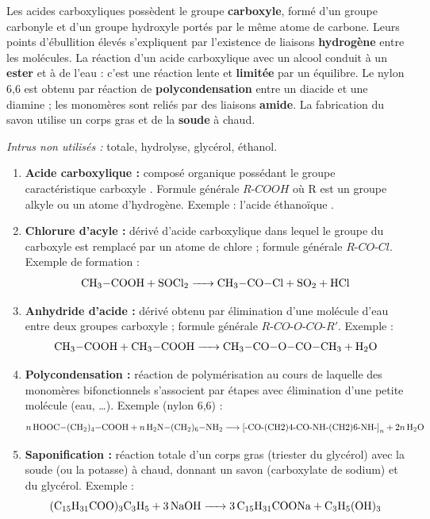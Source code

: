 \documentclass[11pt]{article}
\begin{document}
\begin{corrige}
Les acides carboxyliques possèdent le groupe \textbf{carboxyle}, formé d'un groupe carbonyle et d'un groupe hydroxyle portés par le même atome de carbone. Leurs points d'ébullition élevés s'expliquent par l'existence de liaisons \textbf{hydrogène} entre les molécules. La réaction d'un acide carboxylique avec un alcool conduit à un \textbf{ester} et à de l'eau : c'est une réaction lente et \textbf{limitée} par un équilibre. Le nylon 6,6 est obtenu par réaction de \textbf{polycondensation} entre un diacide et une diamine ; les monomères sont reliés par des liaisons \textbf{amide}. La fabrication du savon utilise un corps gras et de la \textbf{soude} à chaud.

\smallskip
\emph{Intrus non utilisés :} totale, hydrolyse, glycérol, éthanol.
\end{corrige}

\begin{corrige}
\begin{enumerate}
\item \textbf{Acide carboxylique :} composé organique possédant le groupe caractéristique carboxyle . Formule générale $R\text{-}COOH$ où R est un groupe alkyle ou un atome d'hydrogène. Exemple : l'acide éthanoïque .
\item \textbf{Chlorure d'acyle :} dérivé d'acide carboxylique dans lequel le groupe  du carboxyle est remplacé par un atome de chlore ; formule générale $R\text{-}CO\text{-}Cl$. Exemple de formation :
\[ \ce{CH3-COOH + SOCl2 -> CH3-CO-Cl + SO2 + HCl} \]
\item \textbf{Anhydride d'acide :} dérivé obtenu par élimination d'une molécule d'eau entre deux groupes carboxyle ; formule générale $R\text{-}CO\text{-}O\text{-}CO\text{-}R'$. Exemple :
\[ \ce{CH3-COOH + CH3-COOH -> CH3-CO-O-CO-CH3 + H2O} \]
\item \textbf{Polycondensation :} réaction de polymérisation au cours de laquelle des monomères bifonctionnels s'associent par étapes avec élimination d'une petite molécule (eau, \ldots). Exemple (nylon 6,6) :
\[ n\,\ce{HOOC-(CH2)4-COOH} + n\,\ce{H2N-(CH2)6-NH2} \longrightarrow \text{[-CO-(CH2)4-CO-NH-(CH2)6-NH-]}_n + 2n\,\ce{H2O} \]
\item \textbf{Saponification :} réaction totale d'un corps gras (triester du glycérol) avec la soude (ou la potasse) à chaud, donnant un savon (carboxylate de sodium) et du glycérol. Exemple :
\[ \ce{(C15H31COO)3C3H5 + 3 NaOH -> 3 C15H31COONa + C3H5(OH)3} \]
\end{enumerate}
\end{corrige}
\end{document}
